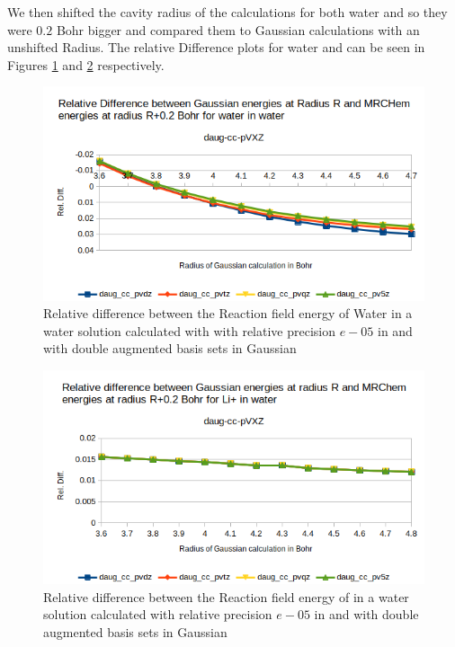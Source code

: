 \documentclass[../master_thesis.tex]{subfiles}
\begin{document}
We then shifted the cavity radius of the \mrchem calculations for both water and
 so they were $0.2$ Bohr bigger and compared them to Gaussian calculations
with an unshifted Radius. The relative Difference plots for water and  can be seen
in Figures \ref{fig:watreldiff02daug} and \ref{fig:lipreldiff02daug} respectively.

\begin{figure}[h!]
  \centering
    \includegraphics[width=\linewidth]{img/watdaugreldiff02.png}
  \caption{Relative difference between the Reaction field energy of Water in a water solution calculated with with relative precision $e-05$ in \mrchem
  and with double augmented basis sets in Gaussian}
  \label{fig:watreldiff02daug}
\end{figure}

\begin{figure}[h!]
  \centering
    \includegraphics[width=\linewidth]{img/lipdaugreldiff02.png}
  \caption{Relative difference between the Reaction field energy of  in a water solution calculated with relative precision $e-05$ in \mrchem
  and with double augmented basis sets in Gaussian}
  \label{fig:lipreldiff02daug}
\end{figure}
\end{document}
